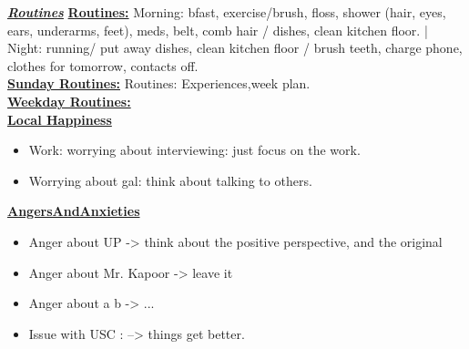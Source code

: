      
      \underline{\bf \textit{Routines}}
        { \tiny \underline{\bf Routines:} Morning: bfast, exercise/brush,
          floss, shower (hair, eyes, ears, underarms, feet), meds, belt,
          comb hair / dishes, clean kitchen floor. |  Night: running/ put
          away dishes, clean kitchen floor / brush teeth, charge phone,
          clothes for tomorrow, contacts off.}\\
        {\tiny \underline{\bf Sunday Routines:} Routines: Experiences,week plan.}\\ 
        {\tiny \underline{\bf Weekday Routines:}}\\
     
        
        
        \underline{\bf Local Happiness} \\
        \begin{itemize} 
          \tiny \item \tiny Work: worrying about interviewing: just focus on the work. 
        \item \tiny Worrying about gal: think about talking to others. 
        \end{itemize}
      
      \underline{\bf AngersAndAnxieties}
        \begin{itemize}
          \tiny \item \tiny Anger about UP -> think about the positive
          perspective, and the original
        \item \tiny Anger about Mr. Kapoor ->  leave it
        \item \tiny Anger about a b  -> ...
        \item \tiny Issue with USC : --> things get better. 
        \end{itemize}

